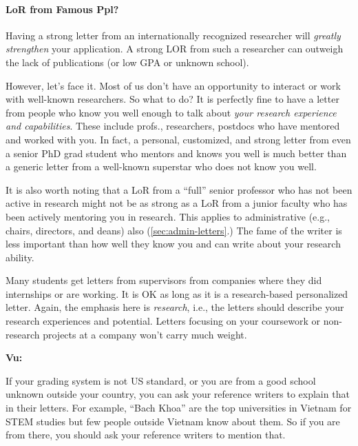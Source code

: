 \documentclass[oneside,11pt,dvipsnames]{book}
\newenvironment{commentbox}[1][]{
  \small
  \begin{mybox}
    {\small \textbf{#1}}
  }{
  \end{mybox}
}
\begin{document}
\paragraph{LoR from Famous Ppl?} Having a strong letter from an internationally recognized researcher will \emph{greatly strengthen} your application. A strong LOR from such a researcher can outweigh the lack of publications (or low GPA or unknown school).


However, let's face it.  Most of us don't have an opportunity to interact or work with well-known researchers.  
So what to do? It is perfectly fine to have a letter from people who know you well enough to talk about \emph{your research experience and capabilities}. These include profs., researchers, postdocs who have mentored and worked with you. In fact, a personal, customized, and strong letter from even a senior PhD grad student who mentors and knows you well is much better than a generic letter from a well-known superstar who does not know you well. 

It is also worth noting that a LoR from a ``full'' senior professor who has not been active in research might not be as strong as a LoR from a junior faculty who has been actively mentoring you in research.  This applies to administrative (e.g., chairs, directors, and deans) also (\autoref{sec:admin-letters}.) The fame of the writer is less important than how well they know you and can write about your research ability.

Many students get letters from supervisors from companies where they did internships or are working.  It is OK as long as it is a research-based personalized letter. Again, the emphasis here is \emph{research}, i.e., the letters should describe your research experiences and potential. Letters focusing on your coursework or non-research projects at a company won't carry much weight.

\begin{commentbox}[Vu:]
  If your grading system is not US standard, or you are from a good school unknown outside your country, you can ask your reference writers to explain that in their letters.  For example, ``Bach Khoa'' are the top universities in Vietnam for STEM studies but few people outside Vietnam know about them.  So if you are from there, you should ask your reference writers to mention that.
\end{commentbox}
\end{document}
